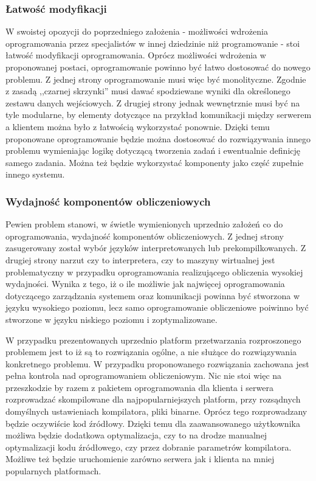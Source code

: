 \documentclass[12pt,a4paper,twoside]{article}
\begin{document}
\subsubsection{Łatwość modyfikacji}

W swoistej opozycji do poprzedniego założenia - możliwości wdrożenia oprogramowania przez specjalistów w innej dziedzinie niż programowanie - stoi łatwość modyfikacji oprogramowania. Oprócz możliwości wdrożenia w proponowanej postaci, oprogramowanie powinno być łatwo dostosować do nowego problemu. Z jednej strony oprogramowanie musi więc być monolityczne. Zgodnie z zasadą ,,czarnej skrzynki'' musi dawać spodziewane wyniki dla określonego zestawu danych wejściowych. Z drugiej strony jednak wewnętrznie musi być na tyle modularne, by elementy dotyczące na przykład komunikacji między serwerem a klientem można było z łatwością wykorzystać ponownie. Dzięki temu proponowane oprogramowanie będzie można dostosować do rozwiązywania innego problemu wymieniając logikę dotyczącą tworzenia zadań i ewentualnie definicję samego zadania. Można też będzie wykorzystać komponenty jako część zupełnie innego systemu.

\subsubsection{Wydajność komponentów obliczeniowych}

Pewien problem stanowi, w świetle wymienionych uprzednio założeń co do oprogramowania, wydajność komponentów obliczeniowych. Z jednej strony zasugerowany został wybór języków interpretowanych lub prekompilkowanych. Z drugiej strony narzut czy to interpretera, czy to maszyny wirtualnej jest problematyczny w przypadku oprogramowania realizującego obliczenia wysokiej wydajności. Wynika z tego, iż o ile możliwie jak najwięcej oprogramowania dotyczącego zarządzania systemem oraz komunikacji powinna być stworzona w języku wysokiego poziomu, lecz samo oprogramowanie obliczeniowe poiwinno być stworzone w języku niskiego poziomu i zoptymalizowane.

W przypadku prezentowanych uprzednio platform przetwarzania rozproszonego problemem jest to iż są to rozwiązania ogólne, a nie służące do rozwiązywania konkretnego problemu. W przypadku proponowanego rozwiązania zachowana jest pełna kontrola nad oprogramowaniem obliczeniowym. Nic nie stoi więc na przeszkodzie by razem z pakietem oprogramowania dla klienta i serwera rozprowadzać skompilowane dla najpopularniejszych platform, przy rozsądnych domyślnych ustawieniach kompilatora, pliki binarne. Oprócz tego rozprowadzany będzie oczywiście kod źródłowy. Dzięki temu dla zaawansowanego użytkownika możliwa będzie dodatkowa optymalizacja, czy to na drodze manualnej optymalizacji kodu źródłowego, czy przez dobranie parametrów kompilatora. Możliwe też będzie uruchomienie zarówno serwera jak i klienta na mniej popularnych platformach.
\end{document}

